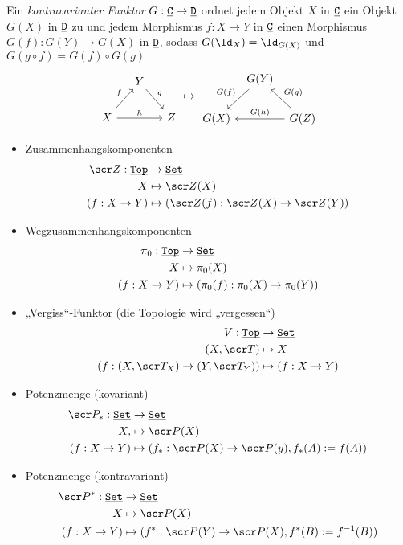 \begin{df}
	Ein \emph{kontravarianter Funktor} $G: \underline{\smash{\mathtt{C}}} \to \underline{\smash{\mathtt{D}}}$ ordnet jedem Objekt $X$ in $\underline{\smash{\mathtt{C}}}$ ein Objekt $G(X)$ in $\underline{\smash{\mathtt{D}}}$ zu und jedem Morphismus $f: X \to Y$ in $\underline{\smash{\mathtt{C}}}$ einen Morphismus $G(f) : G(Y) \to G(X)$ in $\underline{\smash{\mathtt{D}}}$, sodass $G(\Id_X) = \Id_{G(X)}$ und $G(g\circ f) = G(f) \circ G(g)$
	\[
		\begin{tikzcd}[column sep=small]
			~ & Y \arrow{dr}{g} & \\
			X \arrow{ur}{f} \arrow{rr}{h} & & Z
		\end{tikzcd}
		\mapsto
		\begin{tikzcd}[column sep=tiny]
			~ & G(Y) \arrow[leftarrow]{dr}{G(g)} & \\
			G(X) \arrow[leftarrow]{ur}{G(f)} \arrow[leftarrow]{rr}{G(h)} & & G(Z)
		\end{tikzcd}
	\]
\end{df}

\begin{ex}
	\begin{itemize}
		\item
			Zusammenhangskomponenten
			\begin{align*}
				\scr Z: \Cat{Top} &\to \Cat{Set} \\
				X &\mapsto \scr Z(X) \\
				(f:X \to Y) &\mapsto (\scr Z(f): \scr Z(X) \to \scr Z(Y))
			\end{align*}
		\item
			Wegzusammenhangskomponenten
			\begin{align*}
				\pi_0: \underline{\smash{\mathtt{Top}}} &\to \underline{\smash{\mathtt{Set}}} \\
				X & \mapsto \pi_0(X) \\
				(f: X \to Y) &\mapsto (\pi_0(f): \pi_0(X) \to \pi_0(Y))
			\end{align*}
		\item
			„Vergiss“-Funktor (die Topologie wird „vergessen“)
			\begin{align*}
				V: \Cat{Top} &\to \Cat{Set} \\
				(X,\scr T) & \mapsto X \\
				(f: (X,\scr T_X) \to (Y, \scr T_Y)) &\mapsto (f: X \to Y)
			\end{align*}
		\item
			Potenzmenge (kovariant)
			\begin{align*}
				\scr P_*: \Cat{Set} & \to \Cat{Set} \\
				X, & \mapsto \scr P(X) \\
				(f: X \to Y) &\mapsto (f_*: \scr P(X) \to \scr P(y), f_*(A) := f(A))
			\end{align*}
		\item
			Potenzmenge (kontravariant)
			\begin{align*}
				\scr P^*: \Cat{Set} & \to \Cat{Set} \\
				X & \mapsto \scr P(X) \\
				(f: X \to Y) &\mapsto (f^*: \scr P(Y) \to \scr P(X), f^*(B) := f^{-1}(B))
			\end{align*}
	\end{itemize}
\end{ex}


